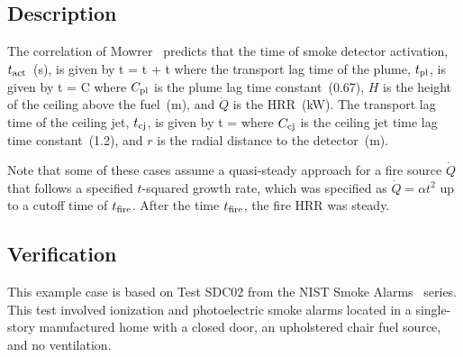 \subsection*{Description}

The correlation of Mowrer~\cite{Mowrer:1} predicts that the time of smoke detector activation, $t\sb{act}$~(\si{s}), is given by
\be
t = t + t
\label{eq:Mowrer}
\ee
where the transport lag time of the plume, $t\sb{pl}$, is given by
\be
t = C 
\label{eq:Mowrer_tpl}
\ee
where $C\sb{pl}$ is the plume lag time constant~(0.67), $H$ is the height of the ceiling above the fuel~(\si{m}), and $\dot Q$ is the HRR~(\si{kW}).
The transport lag time of the ceiling jet, $t\sb{cj}$, is given by
\be
t =  
\label{eq:Mowrer_tcj}
\ee
where $C\sb{cj}$ is the ceiling jet time lag time constant~(1.2), and $r$ is the radial distance to the detector~(\si{m}).

Note that some of these cases assume a quasi-steady approach for a fire source $\dot Q$ that follows a specified $t$-squared growth rate, which was specified as $\dot Q = \alpha t^2$ up to a cutoff time of $t\sb{fire}$. After the time $t\sb{fire}$, the fire HRR was steady.


\clearpage


\subsection*{Verification}

This example case is based on Test SDC02 from the NIST Smoke Alarms~\cite{Bukowski:1} series. This test involved ionization and photoelectric smoke alarms located in a single-story manufactured home with a closed door, an upholstered chair fuel source, and no ventilation.

